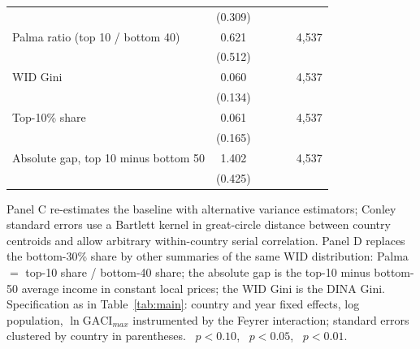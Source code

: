 \begin{table}[p]
\begin{minipage}{\linewidth}
{\begin{tabular}{lcccrr}
 & (0.309) & & & & \\
Palma ratio (top 10 / bottom 40) & 0.621 & & & & 4{,}537 \\
 & (0.512) & & & & \\
WID Gini & 0.060 & & & & 4{,}537 \\
 & (0.134) & & & & \\
Top-10\% share & 0.061 & & & & 4{,}537 \\
 & (0.165) & & & & \\
Absolute gap, top 10 minus bottom 50 & 1.402\sym{***} & & & & 4{,}537 \\
 & (0.425) & & & & \\
\bottomrule
\end{tabular}}
\par\vspace{3pt}\begin{flushleft}\footnotesize Panel C re-estimates the baseline with alternative variance estimators; Conley standard errors use a Bartlett kernel in great-circle distance between country centroids and allow arbitrary within-country serial correlation. Panel D replaces the bottom-30\% share by other summaries of the same WID distribution: Palma $=$ top-10 share / bottom-40 share; the absolute gap is the top-10 minus bottom-50 average income in constant local prices; the WID Gini is the DINA Gini. Specification as in Table~\ref{tab:main}: country and year fixed effects, log population, $\ln\mathrm{GACI}_{max}$ instrumented by the Feyrer interaction; standard errors clustered by country in parentheses. \sym{*}~$p<0.10$, \sym{**}~$p<0.05$, \sym{***}~$p<0.01$.\end{flushleft}
\end{minipage}
\end{table}
